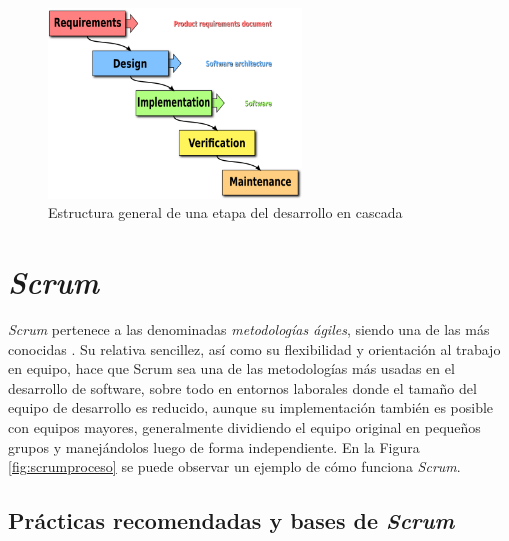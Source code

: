 \begin{figure}[H]
		\includegraphics[width=0.6\textwidth,height=0.6\textheight,keepaspectratio]{./img/Waterfall_model.png}
	\caption{Estructura general de una etapa del desarrollo en cascada}
	\label{fig:cascadadesarrollo}
\end{figure}

\section{\textit{Scrum}}

\textit{Scrum} pertenece a las denominadas \textit{metodologías ágiles}, siendo una de las más conocidas \cite{website:scrum}. Su relativa sencillez, así como su flexibilidad y orientación al trabajo en equipo, hace que Scrum sea una de las metodologías más usadas en el desarrollo de software, sobre todo en entornos laborales donde el tamaño del equipo de desarrollo es reducido, aunque su implementación también es posible con equipos mayores, generalmente dividiendo el equipo original en pequeños grupos y manejándolos luego de forma independiente. En la Figura \ref{fig:scrumproceso} se puede observar un ejemplo de cómo funciona \textit{Scrum}.

\subsection{Prácticas recomendadas y bases de \textit{Scrum}}

